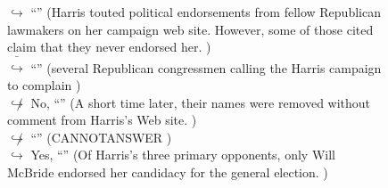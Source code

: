 \documentclass[11pt,a4paper, onecolumn]{article}
\begin{document}
\begin{figure}[t] \small \begin{tcolorbox}[boxsep=0pt,left=5pt,right=0pt,top=2pt,colback = yellow!5] \begin{dialogue}
 \small 
\colorbox{pink!25}{$\hookrightarrow$}
{ ``'' (Harris touted political endorsements from fellow Republican lawmakers on her campaign web site. However, some of those cited claim that they never endorsed her. ) }
\\
\colorbox{pink!25}{ $\bar{\hookrightarrow}$}
{ ``'' (several Republican congressmen calling the Harris campaign to complain ) }
\\
\colorbox{pink!25}{$\not\hookrightarrow$}
\colorbox{red!25}{No,}
{ ``'' (A short time later, their names were removed without comment from Harris's Web site. ) }
\\
\colorbox{pink!25}{$\not\hookrightarrow$}
{ ``'' (CANNOTANSWER ) }
\\
\colorbox{pink!25}{$\hookrightarrow$}
\colorbox{red!25}{Yes,}
{ ``'' (Of Harris's three primary opponents, only Will McBride endorsed her candidacy for the general election. ) }
\\
 \end{dialogue}\end{tcolorbox}\end{figure}
\end{document}
